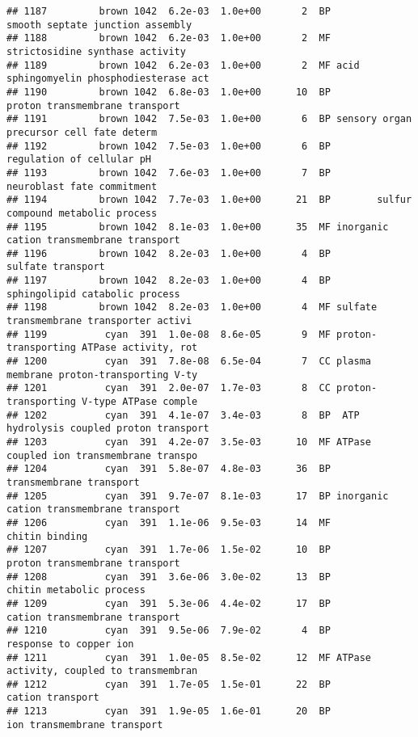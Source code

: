 \documentclass[]{article}
\begin{document}
\begin{verbatim}
## 1187         brown 1042  6.2e-03  1.0e+00       2  BP         smooth septate junction assembly
## 1188         brown 1042  6.2e-03  1.0e+00       2  MF          strictosidine synthase activity
## 1189         brown 1042  6.2e-03  1.0e+00       2  MF acid sphingomyelin phosphodiesterase act
## 1190         brown 1042  6.8e-03  1.0e+00      10  BP           proton transmembrane transport
## 1191         brown 1042  7.5e-03  1.0e+00       6  BP sensory organ precursor cell fate determ
## 1192         brown 1042  7.5e-03  1.0e+00       6  BP                regulation of cellular pH
## 1193         brown 1042  7.6e-03  1.0e+00       7  BP               neuroblast fate commitment
## 1194         brown 1042  7.7e-03  1.0e+00      21  BP        sulfur compound metabolic process
## 1195         brown 1042  8.1e-03  1.0e+00      35  MF inorganic cation transmembrane transport
## 1196         brown 1042  8.2e-03  1.0e+00       4  BP                        sulfate transport
## 1197         brown 1042  8.2e-03  1.0e+00       4  BP           sphingolipid catabolic process
## 1198         brown 1042  8.2e-03  1.0e+00       4  MF sulfate transmembrane transporter activi
## 1199          cyan  391  1.0e-08  8.6e-05       9  MF proton-transporting ATPase activity, rot
## 1200          cyan  391  7.8e-08  6.5e-04       7  CC plasma membrane proton-transporting V-ty
## 1201          cyan  391  2.0e-07  1.7e-03       8  CC proton-transporting V-type ATPase comple
## 1202          cyan  391  4.1e-07  3.4e-03       8  BP  ATP hydrolysis coupled proton transport
## 1203          cyan  391  4.2e-07  3.5e-03      10  MF ATPase coupled ion transmembrane transpo
## 1204          cyan  391  5.8e-07  4.8e-03      36  BP                  transmembrane transport
## 1205          cyan  391  9.7e-07  8.1e-03      17  BP inorganic cation transmembrane transport
## 1206          cyan  391  1.1e-06  9.5e-03      14  MF                           chitin binding
## 1207          cyan  391  1.7e-06  1.5e-02      10  BP           proton transmembrane transport
## 1208          cyan  391  3.6e-06  3.0e-02      13  BP                 chitin metabolic process
## 1209          cyan  391  5.3e-06  4.4e-02      17  BP           cation transmembrane transport
## 1210          cyan  391  9.5e-06  7.9e-02       4  BP                   response to copper ion
## 1211          cyan  391  1.0e-05  8.5e-02      12  MF ATPase activity, coupled to transmembran
## 1212          cyan  391  1.7e-05  1.5e-01      22  BP                         cation transport
## 1213          cyan  391  1.9e-05  1.6e-01      20  BP              ion transmembrane transport

\end{verbatim}
\end{document}
